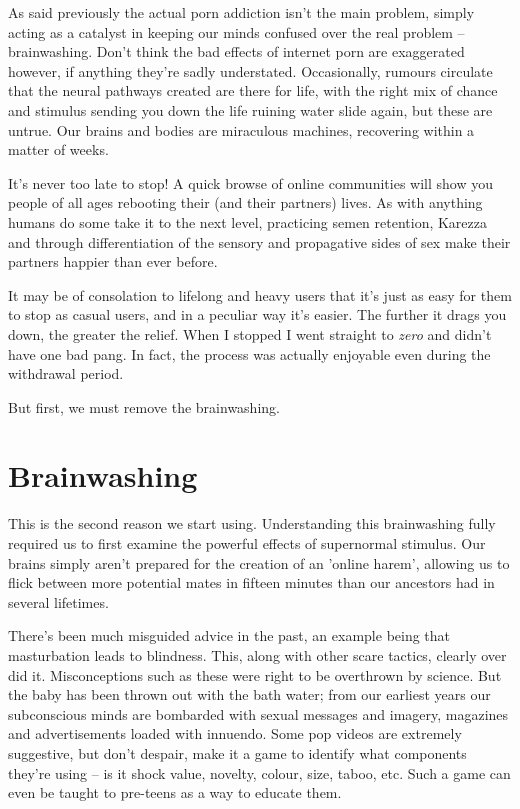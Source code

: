 \documentclass[
]{book}
\begin{document}
As said previously the actual porn addiction isn't the main problem, simply acting as a catalyst in keeping our minds confused over the real problem -- brainwashing. Don't think the bad effects of internet porn are exaggerated however, if anything they're sadly understated. Occasionally, rumours circulate that the neural pathways created are there for life, with the right mix of chance and stimulus sending you down the life ruining water slide again, but these are untrue. Our brains and bodies are miraculous machines, recovering within a matter of weeks.

It's never too late to stop! A quick browse of online communities will show you people of all ages rebooting their (and their partners) lives. As with anything humans do some take it to the next level, practicing semen retention, Karezza and through differentiation of the sensory and propagative sides of sex make their partners happier than ever before.

It may be of consolation to lifelong and heavy users that it's just as easy for them to stop as casual users, and in a peculiar way it's easier. The further it drags you down, the greater the relief. When I stopped I went straight to \emph{zero} and didn't have one bad pang. In fact, the process was actually enjoyable even during the withdrawal period.

But first, we must remove the brainwashing.

\hypertarget{brainwashing}{%
\chapter{Brainwashing}\label{brainwashing}}

This is the second reason we start using. Understanding this brainwashing fully required us to first examine the powerful effects of supernormal stimulus. Our brains simply aren't prepared for the creation of an 'online harem', allowing us to flick between more potential mates in fifteen minutes than our ancestors had in several lifetimes.

There's been much misguided advice in the past, an example being that masturbation leads to blindness. This, along with other scare tactics, clearly over did it. Misconceptions such as these were right to be overthrown by science. But the baby has been thrown out with the bath water; from our earliest years our subconscious minds are bombarded with sexual messages and imagery, magazines and advertisements loaded with innuendo. Some pop videos are extremely suggestive, but don't despair, make it a game to identify what components they're using -- is it shock value, novelty, colour, size, taboo, etc. Such a game can even be taught to pre-teens as a way to educate them.
\end{document}
